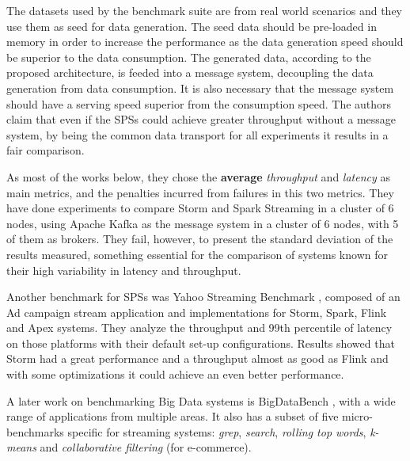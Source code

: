 \documentclass[ppgc,diss,english]{iiufrgs}
\begin{document}
The datasets used by the benchmark suite are from real world scenarios and they use them as seed for data generation. The seed data should be pre-loaded in memory in order to increase the performance as the data generation speed should be superior to the data consumption. The generated data, according to the proposed architecture, is feeded into a message system, decoupling the data generation from data consumption. It is also necessary that the message system should have a serving speed superior from the consumption speed. The authors claim that even if the SPSs could achieve greater throughput without a message system, by being the common data transport for all experiments it results in a fair comparison.

As most of the works below, they chose the \textbf{average} \emph{throughput} and \emph{latency} as main metrics, and the penalties incurred from failures in this two metrics. They have done experiments to compare Storm and Spark Streaming in a cluster of 6 nodes, using Apache Kafka as the message system in a cluster of 6 nodes, with 5 of them as brokers. They fail, however, to present the standard deviation of the results measured, something essential for the comparison of systems known for their high variability in latency and throughput.


Another benchmark for SPSs was Yahoo Streaming Benchmark \cite{yahoo2015bench}, composed of an Ad campaign stream application and implementations for Storm, Spark, Flink and Apex systems. They analyze the throughput and 99th percentile of latency on those platforms with their default set-up configurations. Results showed that Storm had a great performance and a throughput almost as good as Flink and with some optimizations it could achieve an even better performance.


A later work on benchmarking Big Data systems is BigDataBench \cite{wang2014bigdatabench}, with a wide range of applications from multiple areas. It also has a subset of five micro-benchmarks specific for streaming systems: \textit{grep}, \textit{search}, \textit{rolling top words}, \textit{k-means} and \textit{collaborative filtering} (for e-commerce).
\end{document}
